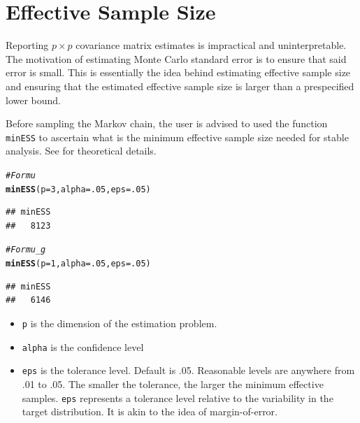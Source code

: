 \documentclass[11pt]{article}\usepackage[]{graphicx}\usepackage[]{color}
\makeatletter
\newcommand{\hlnum}[1]{\textcolor[rgb]{0.686,0.059,0.569}{#1}}%
\newcommand{\hlcom}[1]{\textcolor[rgb]{0.678,0.584,0.686}{\textit{#1}}}%
\newcommand{\hlstd}[1]{\textcolor[rgb]{0.345,0.345,0.345}{#1}}%
\newcommand{\hlkwc}[1]{\textcolor[rgb]{0.333,0.667,0.333}{#1}}%
\newcommand{\hlkwd}[1]{\textcolor[rgb]{0.737,0.353,0.396}{\textbf{#1}}}%
\newenvironment{kframe}{%
 \def\at@end@of@kframe{}%
 \ifinner\ifhmode%
  \def\at@end@of@kframe{\end{minipage}}%
  \begin{minipage}{\columnwidth}%
 \fi\fi%
 \def\FrameCommand##1{\hskip\@totalleftmargin \hskip-\fboxsep
 \colorbox{shadecolor}{##1}\hskip-\fboxsep
     \hskip-\linewidth \hskip-\@totalleftmargin \hskip\columnwidth}%
 \MakeFramed {\advance\hsize-\width
   \@totalleftmargin\z@ \linewidth\hsize
   \@setminipage}}%
 {\par\unskip\endMakeFramed%
 \at@end@of@kframe}
\newenvironment{knitrout}{}{} %
\makeatother
\begin{document}
\section{Effective Sample Size}
Reporting $p \times p$ covariance matrix estimates is impractical and uninterpretable. The motivation of estimating Monte Carlo standard error is to ensure that said error is small. This is essentially the idea behind estimating effective sample size and ensuring that the estimated effective sample size is larger than a prespecified lower bound.

Before sampling the Markov chain, the user is advised to used the function \texttt{minESS} to ascertain what is the minimum effective sample size needed for stable analysis. See \cite{vats:fleg:jones:2017b} for theoretical details.
\begin{knitrout}
\color{fgcolor}\begin{kframe}
\begin{alltt}
\hlcom{# For mu}
\hlkwd{minESS}\hlstd{(}\hlkwc{p} \hlstd{=} \hlnum{3}\hlstd{,} \hlkwc{alpha} \hlstd{=} \hlnum{.05}\hlstd{,} \hlkwc{eps} \hlstd{=} \hlnum{.05}\hlstd{)}
\end{alltt}
\begin{verbatim}
## minESS 
##   8123
\end{verbatim}
\begin{alltt}
\hlcom{#For mu_g}
\hlkwd{minESS}\hlstd{(}\hlkwc{p} \hlstd{=} \hlnum{1}\hlstd{,} \hlkwc{alpha} \hlstd{=} \hlnum{.05}\hlstd{,} \hlkwc{eps} \hlstd{=} \hlnum{.05}\hlstd{)}
\end{alltt}
\begin{verbatim}
## minESS 
##   6146
\end{verbatim}
\end{kframe}
\end{knitrout}

\begin{itemize}
	\item \texttt{p} is the dimension of the estimation problem.
	\item \texttt{alpha} is the confidence level
	\item \texttt{eps} is the tolerance level. Default is .05. Reasonable levels are anywhere from .01 to .05. The smaller the tolerance, the larger the minimum effective samples. \texttt{eps} represents a tolerance level relative to the variability in the target distribution. It is akin to the idea of margin-of-error.
\end{itemize}
\end{document}

